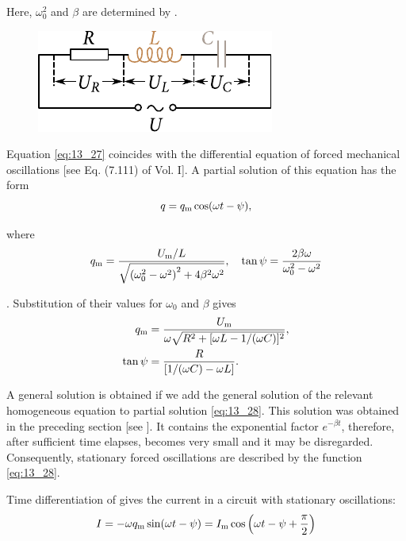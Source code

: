\noindent
Here, $\omega_0^2$ and $\beta$ are determined by .

\begin{figure}[t]
	\begin{center}
		\includegraphics[scale=1]{figures/ch_13/fig_13_5.pdf}
		\caption[]{}
		\label{fig:13_5}
	\end{center}
	\vspace{-0.8cm}
\end{figure}

Equation \eqref{eq:13_27} coincides with the differential equation of forced mechanical oscillations [see Eq. (7.111) of Vol. I].
A partial solution of this equation has the form
\begin{equation}\label{eq:13_28}
    q = q_{\text{m}} \cos(\omega t - \psi),
\end{equation}

\noindent
where
\begin{equation*}
    q_{\text{m}} = \frac{U_{\text{m}}/L}{\sqrt{\left(\omega_0^2-\omega^2\right)^2 + 4\beta^2\omega^2}},\quad \tan\psi = \frac{2\beta\omega}{\omega_0^2-\omega^2}
\end{equation*}

.
Substitution of their values for $\omega_0$ and $\beta$ gives
\begin{align}
    q_{\text{m}} &= \frac{U_{\text{m}}}{\omega \sqrt{R^2 + [\omega L - 1/(\omega C)]^2}},\label{eq:13_29}\\
    \tan\psi &= \frac{R}{[1/(\omega C) - \omega L]}.\label{eq:13_30}
\end{align}

A general solution is obtained if we add the general solution of the relevant homogeneous equation to partial solution \eqref{eq:13_28}.
This solution was obtained in the preceding section [see ].
It contains the exponential factor $e^{-\beta t}$, therefore, after sufficient time elapses, becomes very small and it may be disregarded.
Consequently, stationary forced oscillations are described by the function \eqref{eq:13_28}.

Time differentiation of  gives the current in a circuit with stationary oscillations:
\begin{equation*}
    I = -\omega q_{\text{m}} \sin(\omega t - \psi) = I_{\text{m}} \cos\left( \omega t - \psi + \frac{\pi}{2} \right)
\end{equation*}

